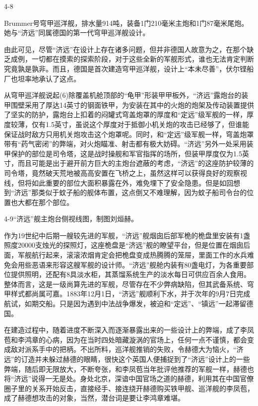 \documentclass[12pt,UTF8]{ctexbook}
\begin{document}
4-8

Brummer号穹甲巡洋舰，排水量914吨，装备1门210毫米主炮和1门87毫米尾炮。她与“济远”同属德国的第一代穹甲巡洋舰设计。

由此可见，尽管“济远”在设计上存在诸多问题，但并非德国人故意为之，在那个缺乏成例，一切都在摸索的探索阶段，对于这些全新的军舰形式，谁也无法肯定判断究竟孰是孰非。而且，德国是首次建造穹甲巡洋舰，设计上“本未尽善”，伏尔铿船厂也坦率地承认了这点。

从穹甲巡洋舰说起(6)除覆盖机舱顶部的“龟甲”形装甲甲板外，“济远”露炮台的装甲围壁采用了厚达14英寸的钢面铁甲，为安装在其中的火炮的炮架及传动装置提供了坚实的防护，露炮台上扣着的闷罐式穹盖炮罩的厚度和“定远”级军舰的一样，厚度较薄，仅有1.5英寸，虽说这个厚度对于抵御小机关炮的攻击已经够了，但谁能保证战时敌方只用机关炮攻击这个炮罩呢。同时，和“定远”级军舰一样，穹盖炮罩带有“药气密闭”的弊端，对火炮瞄准、射击都有极大妨碍。“济远”另外一处采用装甲保护的部位是司令塔，这是战时操舰和军官指挥的场所，但装甲厚度仅为1.5英寸，而且可能是出于避开前方巨大的主炮台遮蔽的考虑，“济远”的这座防护较薄的司令塔，竟然破天荒地被高高安置在飞桥之上，虽然这样可以获得良好的观察视线，但将如此重要的部位大面积暴露在外，难免埋下了安全隐患。但是如回想到“济远”那类似于蚊子船的舰体布置，这点倒又不难理解，因为蚊子船司令台的位置也大都在那个部位。

4-9“济远”舰主炮台侧视线图，制图刘烜赫。

作为19世纪中后期一艘较先进的军舰，“济远”舰烟囱后部军桅的桅盘里安装有1盏照度20000支烛光的探照灯，这座桅盘是“济远”舰的瞭望平台，但是位置在烟囱后面，军舰航行起来，滚滚浓烟肯定会把桅盘变成热腾腾的笼屉，里面工作的水兵难免会用些恶语来形容这艘军舰的设计师。“济远”舰舱内装有80盏电灯，为各重要部位提供照明，还配有8具淡水柜，其蒸馏系统生产的淡水每日可供应百余人食用。整体而言，这是一级尚算先进的军舰，尽管存在不少弊病缺陷，但其武备系统、穹甲样式都尚属可嘉。1883年12月1日，“济远”舰顺利下水，并于次年的9月7日完成航试，如期交船。只是因为遇到中法战争爆发，被迫和“定远”、“镇远”一起滞留德国。

在建造过程中，随着进度不断深入而逐渐暴露出来的一些设计上的弊端，成了李凤苞和李鸿章的心病，因为在当时四处暗藏漩涡的官场上，任何一点不谨慎，都会变成敌对派系手中的把柄。不出所料，巡洋舰推销的失败，令赫德大为恼火，“济远”的订造并未躲过赫德的眼睛，很快这个英国人便捕捉到了“济远”设计上的一些弊端，随后即无限放大，不断夸张，和李凤苞当年批评他推荐的军舰一样，赫德也将“济远”说得一无是处。身处北京，深谙中国官场之道的赫德，利用其在中国官僚圈子里的关系开始反击，直接经手、接连绕开赫德购买铁甲舰、巡洋舰的李凤苞，成了赫德想攻击的对象，当然，潜台词是要让李鸿章难堪。
\end{document}
